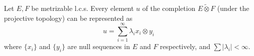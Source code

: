 Let $E, F$ be metrizable l.c.s. Every element $u$ of the completion $E \tilde{\otimes} F$ (under the projective topology) can be represented as $$u = \sum_{i=1}^{\infty} \lambda_i x_i \otimes y_i$$ where $\{x_i\}$ and $\{y_i\}$ are null sequences in $E$ and $F$ respectively, and $\sum |\lambda_i| < \infty$.
